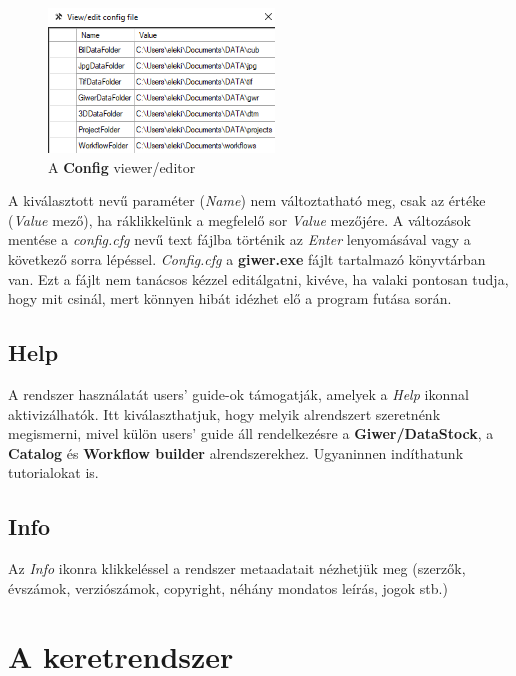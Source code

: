 \documentclass[a4paper,12pt]{book}
\begin{document}
 \begin{figure}[h]
 	\centering
 	\includegraphics[width=6cm]{config.png}
 	\caption{A \textbf{Config} viewer/editor}
 	\label{fig:config}
 \end{figure}
 

A kiválasztott nevű paraméter (\textit{Name}) nem változtatható meg, csak az értéke (\textit{Value} mező), ha ráklikkelünk a megfelelő sor \textit{Value} mezőjére. A változások mentése a \textit{config.cfg} nevű text fájlba történik az \textit{Enter} lenyomásával vagy a következő sorra lépéssel. \textit{Config.cfg} a \textbf{giwer.exe} fájlt tartalmazó könyvtárban van. Ezt a fájlt nem tanácsos kézzel editálgatni, kivéve, ha valaki pontosan tudja, hogy mit csinál, mert könnyen hibát idézhet elő a program futása során.



\section{Help}

A rendszer használatát users' guide-ok támogatják, amelyek a \textit{Help} ikonnal aktivizálhatók. Itt kiválaszthatjuk, hogy melyik alrendszert szeretnénk megismerni, mivel külön users' guide áll rendelkezésre a \textbf{Giwer/DataStock}, a \textbf{Catalog} és \textbf{Workflow builder} alrendszerekhez. Ugyaninnen indíthatunk tutorialokat is.


\section{Info}

Az \textit{Info} ikonra klikkeléssel a rendszer metaadatait nézhetjük meg (szerzők, évszámok, verziószámok, copyright, néhány mondatos leírás, jogok stb.)


\chapter{A keretrendszer}
\end{document}

